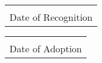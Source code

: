 \documentclass{article}
\begin{document}
\vspace{8ex}

\noindent
\begin{minipage}{0.4\textwidth}
    \begin{tabular}{@{}p{\textwidth}@{}}
    \hrulefill \\
    Date of Recognition \\
    \end{tabular}
\end{minipage}
\hfill
\begin{minipage}{0.4\textwidth}
    \begin{tabular}{@{}p{\textwidth}@{}}
    \hrulefill \\
    Date of Adoption \\
    \end{tabular}
\end{minipage}
\end{document}
